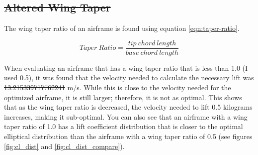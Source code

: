 \documentclass[journal]{new-aiaa} %
\providecommand{\DIFadd}[1]{{\protect\color{blue}\uwave{#1}}} %
\providecommand{\DIFdel}[1]{{\protect\color{red}\sout{#1}}}                      %
\providecommand{\DIFaddbegin}{} %
\providecommand{\DIFaddend}{} %
\providecommand{\DIFdelbegin}{} %
\providecommand{\DIFdelend}{} %
\newcommand{\DIFscaledelfig}{0.5}
\newlength{\DIFdelgraphicswidth} %
\newlength{\DIFdelgraphicsheight} %
\newcommand{\DIFaddincludegraphics}[2][]{{\color{blue}\fbox{\DIFOincludegraphics[#1]{#2}}}} %
\newcommand{\DIFdelincludegraphics}[2][]{%
\sbox{\DIFdelgraphicsbox}{\DIFOincludegraphics[#1]{#2}}%
\settoboxwidth{\DIFdelgraphicswidth}{\DIFdelgraphicsbox} %
\settoboxtotalheight{\DIFdelgraphicsheight}{\DIFdelgraphicsbox} %
\scalebox{\DIFscaledelfig}{%
\parbox[b]{\DIFdelgraphicswidth}{\usebox{\DIFdelgraphicsbox}\\[-\baselineskip] \rule{\DIFdelgraphicswidth}{0em}}\llap{\resizebox{\DIFdelgraphicswidth}{\DIFdelgraphicsheight}{%
\setlength{\unitlength}{\DIFdelgraphicswidth}%
\begin{picture}(1,1)%
\thicklines\linethickness{2pt} %
{\color[rgb]{1,0,0}\put(0,0){\framebox(1,1){}}}%
{\color[rgb]{1,0,0}\put(0,0){\line( 1,1){1}}}%
{\color[rgb]{1,0,0}\put(0,1){\line(1,-1){1}}}%
\end{picture}%
}\hspace*{3pt}}} %
} %
\DeclareRobustCommand{\DIFaddbegin}{\DIFOaddbegin \let\includegraphics\DIFaddincludegraphics} %
\DeclareRobustCommand{\DIFaddend}{\DIFOaddend \let\includegraphics\DIFOincludegraphics} %
\DeclareRobustCommand{\DIFdelbegin}{\DIFOdelbegin \let\includegraphics\DIFdelincludegraphics} %
\DeclareRobustCommand{\DIFdelend}{\DIFOaddend \let\includegraphics\DIFOincludegraphics} %
\begin{document}
	\DIFdelbegin \subsection{\DIFdel{Altered Wing Taper}}
\addtocounter{subsection}{-1}%
\DIFdelend The wing taper ratio of an airframe is found using equation \ref{eqn:taper-ratio}.

	\begin{equation}
		Taper\ Ratio = \frac{tip\ chord\ length}{base\ chord\ length}
		\label{eqn:taper-ratio}
	\end{equation}

	When evaluating an airframe that has a wing taper ratio that is less than 1.0 (I used 0.5), it was found that the velocity needed to calculate the necessary lift was \DIFdelbegin \DIFdel{13.215339717762241 }\DIFdelend \DIFaddbegin \DIFadd{13.215 }\DIFaddend m/s. While this is close to the velocity needed for the optimized airframe, it is still larger; therefore, it is not as optimal. This shows that as the wing taper ratio is decreased, the velocity needed to lift 0.5 kilograms increases, making it sub-optimal. You can also see that an airframe with a wing taper ratio of 1.0 has a lift coefficient distribution that is closer to the optimal elliptical distribution than the airframe with a wing taper ratio of 0.5 (see figures \ref{fig:cl_dist} and \ref{fig:cl_dist_compare}).\\
\end{document}
